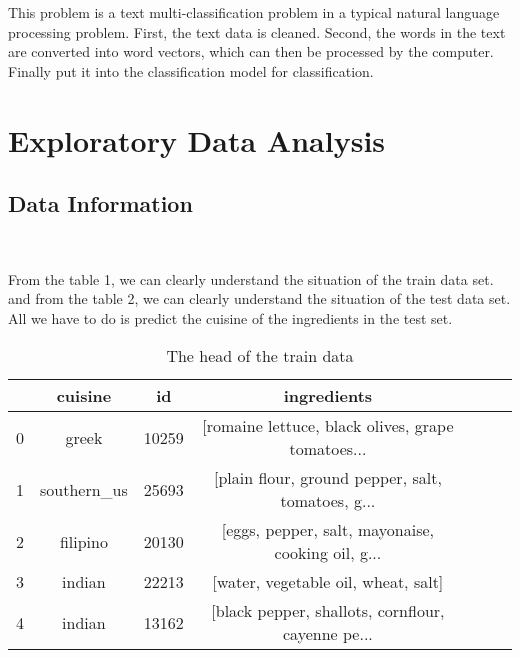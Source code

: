 This problem is a text multi-classification problem in a typical natural language processing problem.
First, the text data is cleaned. Second, the words in the text are converted into word vectors, 
which can then be processed by the computer. Finally put it into the classification model for classification.

\section{Exploratory Data Analysis} \label{sec-data_exploration}

\subsection{Data Information}
\

From the table 1, we can clearly understand the situation of the 
train data set. and from the table 2, we can clearly understand the situation of the 
test data set. All we have to do is predict the cuisine of the ingredients in the test set.

\begin{table}[htbp]  \centering
	\caption{The head of the train data}
	\label{tbl:data information}
	\begin{tabular}{ccccccc}
		\hline
		& cuisine & id & ingredients\\
        \hline
        0 & greek       & 10259 & [romaine lettuce, black olives, grape tomatoes... \\
        1 & southern_us & 25693 & [plain flour, ground pepper, salt, tomatoes, g... \\
        2 & filipino    & 20130 & [eggs, pepper, salt, mayonaise, cooking oil, g... \\
        3 & indian      & 22213 & [water, vegetable oil, wheat, salt] \\
        4 & indian      & 13162 & [black pepper, shallots, cornflour, cayenne pe... \\
        \hline 
	\end{tabular}
\end{table}

